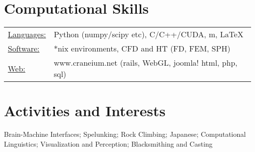 \documentclass{res}
\begin{document}
\begin{resume}
\section{Computational Skills}
   \begin{tabular}{l p{5.5in}}
    \underline{Languages:} & Python (numpy/scipy etc), C/C++/CUDA, m, \LaTeX  \\
    \underline{Software:}  & *nix environments, CFD and HT (FD, FEM, SPH) \\
    \underline{Web:}       & www.craneium.net (rails, WebGL, joomla! html, php, sql)
 \end{tabular}

\section{Activities and Interests}
Brain-Machine Interfaces; Spelunking; Rock Climbing; Japanese; 
Computational Linguistics; Visualization and Perception; Blacksmithing and Casting
\end{resume} 
\end{document}

